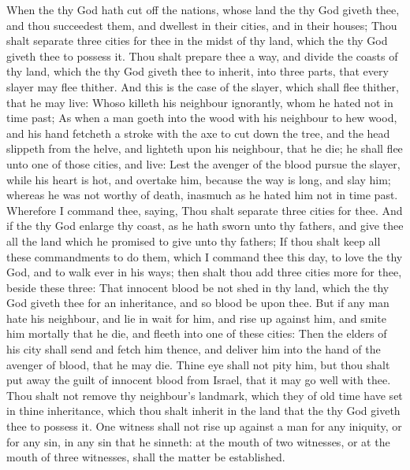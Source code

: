 \begin{biblechapter} %
 When the \LORD thy God hath cut off the nations, whose land the \LORD thy God giveth thee, and thou succeedest them, and dwellest in their cities, and in their houses;
\verse Thou shalt separate three cities for thee in the midst of thy land, which the \LORD thy God giveth thee to possess it.
\verse Thou shalt prepare thee a way, and divide the coasts of thy land, which the \LORD thy God giveth thee to inherit, into three parts, that every slayer may flee thither.
\verse And this is the case of the slayer, which shall flee thither, that he may live: Whoso killeth his neighbour ignorantly, whom he hated not in time past;
\verse As when a man goeth into the wood with his neighbour to hew wood, and his hand fetcheth a stroke with the axe to cut down the tree, and the head slippeth from the helve, and lighteth upon his neighbour, that he die; he shall flee unto one of those cities, and live:
\verse Lest the avenger of the blood pursue the slayer, while his heart is hot, and overtake him, because the way is long, and slay him; whereas he was not worthy of death, inasmuch as he hated him not in time past.
\verse Wherefore I command thee, saying, Thou shalt separate three cities for thee.
\verse And if the \LORD thy God enlarge thy coast, as he hath sworn unto thy fathers, and give thee all the land which he promised to give unto thy fathers;
\verse If thou shalt keep all these commandments to do them, which I command thee this day, to love the \LORD thy God, and to walk ever in his ways; then shalt thou add three cities more for thee, beside these three:
\verse That innocent blood be not shed in thy land, which the \LORD thy God giveth thee for an inheritance, and so blood be upon thee.
\verse But if any man hate his neighbour, and lie in wait for him, and rise up against him, and smite him mortally that he die, and fleeth into one of these cities:
\verse Then the elders of his city shall send and fetch him thence, and deliver him into the hand of the avenger of blood, that he may die.
\verse Thine eye shall not pity him, but thou shalt put away the guilt of innocent blood from Israel, that it may go well with thee.
\verse Thou shalt not remove thy neighbour's landmark, which they of old time have set in thine inheritance, which thou shalt inherit in the land that the \LORD thy God giveth thee to possess it.
 One witness shall not rise up against a man for any iniquity, or for any sin, in any sin that he sinneth: at the mouth of two witnesses, or at the mouth of three witnesses, shall the matter be established.

\end{biblechapter}
